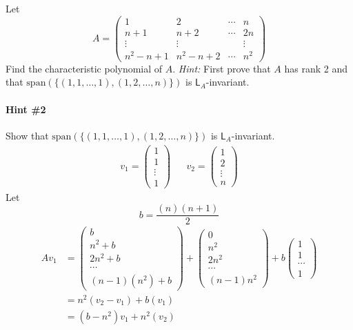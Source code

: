 Let
\[
A = \begin{pmatrix}
1 & 2 & \cdots & n\\
n+1 & n+2 & \cdots & 2n\\
\vdots & \vdots & & \vdots\\
n^2-n + 1 & n^2 -n +2 & \cdots & n^2
\end{pmatrix}
\]
Find the characteristic polynomial of $A.$ {\it Hint:} First prove
that $A$ has rank 2 and that
$\text{span}(\{(1,1,\dotsc,1),(1,2,\dotsc,n)\})$ is
$\mathsf{L}_A$-invariant.
\paragraph{Hint \#2} Show that $\text{span}(\{(1,1,\dotsc,1),(1,2,\dotsc,n)\})$ is
$\mathsf{L}_A$-invariant.
\begin{align}
v_1 = \begin{pmatrix}1\\1\\\vdots\\1\end{pmatrix} & & v_2
= \begin{pmatrix} 1\\2\\\vdots\\n\end{pmatrix}
\end{align}
Let 
\begin{equation}
b = \frac{(n)(n+1)}{2}
\end{equation}
\begin{align}
Av_1 &= \begin{pmatrix}
b\\
n^2 +b\\
2n^2 + b\\
\cdots\\
(n-1)(n^2) + b
\end{pmatrix}
+
\begin{pmatrix}
0\\
n^2\\
2n^2\\
\cdots\\
(n-1)n^2
\end{pmatrix}
+
b\begin{pmatrix}
1\\
1\\
\cdots\\
1
\end{pmatrix}\\
&= n^2(v_2-v_1) + b(v_1)\\
&= (b-n^2)v_1 + n^2(v_2)
\end{align}
